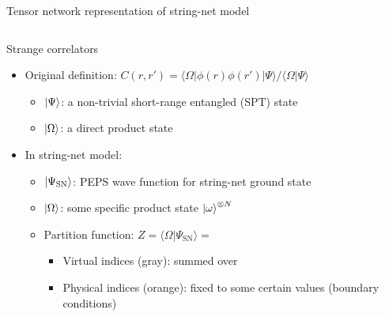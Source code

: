 \documentclass{fdubeamer}
\newcommand{\tikzinput}[1]{}
\newcommand{\1}{\mathbb{1}}
\begin{document}
\begin{frame}{Tensor network representation of string-net model}
\begin{columns}[c]
\end{columns}


\end{frame}

\begin{frame}{Strange correlators}

\begin{itemize}
  \item Original definition: $C(r,r') = \langle\Omega|\phi(r)\phi(r')|\Psi\rangle / \langle\Omega|\Psi\rangle$

    \begin{itemize}
      \item $\ket{\Psi}$: a non-trivial short-range entangled (SPT) state
      \item $\ket{\Omega}$: a direct product state
    \end{itemize}

  \item In string-net model:

    \begin{itemize}
      \item $\ket{\Psi_\mathrm{SN}}$: PEPS wave function for string-net ground state
      \item $\ket{\Omega}$: some specific product state $\ket{\omega}^{\otimes N}$
      \item Partition function: $Z = \langle\Omega|\Psi_\mathrm{SN}\rangle = \tikzinput{strange-correlator}$

        \begin{itemize}
          \item Virtual indices (gray): summed over
          \item Physical indices (orange): fixed to some certain values (boundary conditions)
        \end{itemize}
    \end{itemize}
\end{itemize}

\end{frame}
\end{document}
